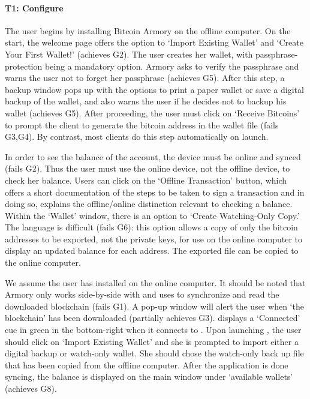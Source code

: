 \paragraph{T1: Configure} The user begins by installing Bitcoin Armory on the offline computer. On the start, the welcome page offers the option to `Import Existing Wallet' and `Create Your First Wallet!' (achieves G2). The user creates her wallet, with passphrase-protection being a mandatory option. Armory asks to verify the passphrase and warns the user not to forget her passphrase (achieves G5). After this step, a backup window pops up with the options to print a paper wallet or save a digital backup of the wallet, and also warns the user if he decides not to backup his wallet (achieves G5). After proceeding, the user must click on `Receive Bitcoins' to prompt the client to generate the bitcoin address in the wallet file (fails G3,G4). By contrast, most clients do this step automatically on launch. 

In order to see the balance of the account, the device must be online and synced (fails G2). Thus the user must use the online device, not the offline device, to check her balance. Users can click on the `Offline Transaction' button, which offers a short documentation of the steps to be taken to sign a transaction and in doing so, explains the offline/online distinction relevant to checking a balance. Within the `Wallet' window, there is an option to `Create Watching-Only Copy.' The language is difficult (fails G6): this option allows a copy of only the bitcoin addresses to be exported, not the private keys, for use on the online computer to display an updated balance for each address. The exported file can be copied to the online computer.

We assume the user has installed \armory on the online computer. It should be noted that Armory only works side-by-side with \bitcoinclient and uses \bitcoinclient to synchronize and read the downloaded blockchain (fails G1). A pop-up window will alert the user when `the blockchain'  has been downloaded (partially achieves G3). \armory displays a `Connected' cue in green in the bottom-right when it connects to \bitcoinclient. Upon launching \armory, the user should click on `Import Existing Wallet' and she is prompted to import either a digital backup or watch-only wallet. She should chose the watch-only back up file that has been copied from the offline computer. After the application is done syncing, the balance is displayed on the main window under `available wallets' (achieves G8).

